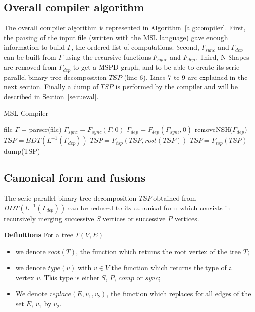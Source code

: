 \subsection{Overall compiler algorithm}

The overall compiler algorithm is represented in Algorithm~\ref{alg:compiler}. First, the parsing of the input file (written with the MSL language) gave enough information to build $\Gamma$, the ordered list of computations. Second, $\Gamma_{sync}$ and $\Gamma_{dep}$ can be built from $\Gamma$ using the recursive functions $F_{sync}$ and $F_{dep}$. Third, N-Shapes are removed from $\Gamma_{dep}$ to get a MSPD graph, and to be able to create its serie-parallel binary tree decomposition $TSP$ (line 6). Lines 7 to 9 are explained in the next section. Finally a dump of $TSP$ is performed by the compiler and will be described in Section~\ref{sect:eval}.

\begin{algorithm}
\caption{MSL Compiler}
\label{alg:compiler}
\begin{algorithmic}[1]
 {file}
\State $\Gamma$ = parser(file)
\State $\Gamma_{sync} = F_{sync}(\Gamma,0)$
\State $\Gamma_{dep} = F_{dep}(\Gamma_{sync},0)$
\State removeNSH($\Gamma_{dep}$)
\State $TSP = BDT(L^{-1}(\Gamma_{dep}))$
\State $TSP = F_{tsp}(TSP,root(TSP))$
\State $TSP = F_{tsp}(TSP)$
\EndIf
\State dump(TSP)
\EndProcedure
\end{algorithmic}
\end{algorithm}

\subsection{Canonical form and fusions}

The serie-parallel binary tree decomposition $TSP$ obtained from $BDT(L^{-1}(\Gamma_{dep}))$ can be reduced to its canonical form which consists in recursively merging successive $S$ vertices or successive $P$ vertices.

\medskip
\noindent \textbf{Definitions} For a tree $T(V,E)$
\begin{itemize}
\item we denote $root(T)$, the function which returns the root vertex of the tree $T$;
\item we denote $type(v)$ with $v \in V$ the function which returns the type of a vertex $v$. This type is either $S$, $P$, $comp$ or $sync$;
\item We denote $replace(E,v_1,v_2)$, the function which replaces for all edges of the set $E$, $v_1$ by $v_2$.
\end{itemize}


